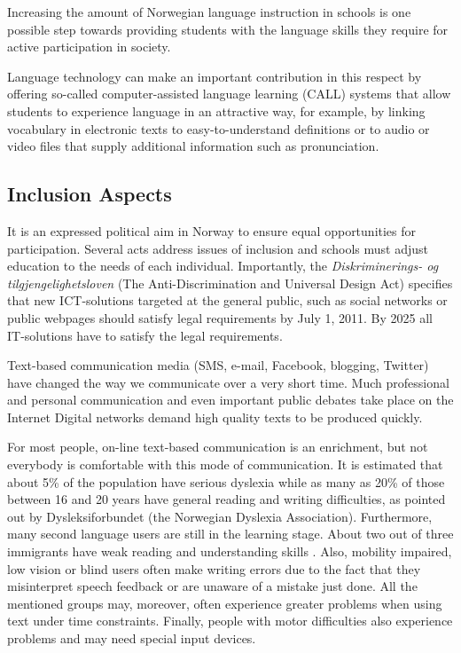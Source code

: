\begin{multicols}{2}
Increasing the amount of Norwegian language instruction in schools is one possible step towards providing students with the language skills they require for active participation in society. 

Language technology can make an important contribution in this respect by offering so-called computer-assisted language learning (CALL) systems that allow students to experience language in an attractive way, for example, by linking vocabulary in electronic texts to easy-to-understand definitions or to audio or video files that supply additional information such as pronunciation.

\subsection{Inclusion Aspects} 

It is an expressed political aim in Norway to ensure equal opportunities for participation. 
Several acts address issues of inclusion and schools must adjust education to the needs of each individual. 
Importantly, the \textit{Diskriminerings- og tilgjengelighetsloven}  (The Anti-Discrimination and Universal Design Act) specifies that new ICT-solutions targeted at the general public, such as social networks or public webpages should satisfy legal requirements by July 1, 2011. 
By 2025 all IT-solutions have to satisfy the legal requirements. 


Text-based communication media (SMS, e-mail, Facebook, blogging, Twitter) have changed the way we communicate over a very short time. 
Much professional and personal communication and even important public debates take place on the Internet Digital networks demand high quality texts to be produced quickly. 

For most people, on-line text-based communication is an enrichment, but not everybody is comfortable with this mode of communication. 
It is estimated that about 5\% of the population have serious dyslexia while as many as 20\% of those between 16 and 20 years have general reading and writing difficulties, as pointed out by Dysleksiforbundet (the Norwegian Dyslexia Association).
Furthermore, many second language users are still in the learning stage.
About two out of three immigrants have weak reading and understanding skills \cite{gabrielsen2007}.
Also, mobility impaired, low vision or blind users often make writing errors due to the fact that they misinterpret speech feedback or are unaware of a mistake just done. 
All the mentioned groups may, moreover, often experience greater problems when using text under time constraints. 
Finally, people with motor difficulties also experience problems and may need special input devices.


\end{multicols}
